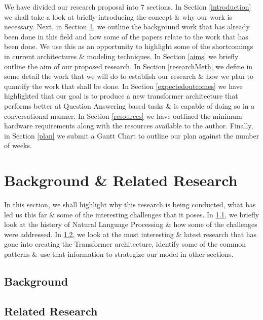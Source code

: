 \documentclass[11pt]{article}
\begin{document}
We have divided our research proposal into 7 sections.
In Section \ref{introduction} we shall take a look at briefly introducing the concept \& why our work is necessary. Next, in Section \ref{backRR}, we outline the background work that has already been done in this field and how some of the papers relate to the work that has been done. We use this as an opportunity to highlight some of the shortcomings in current architectures \& modeling techniques. In Section \ref{aims} we briefly outline the aim of our proposed research. In Section \ref{researchMeth} we define in some detail the work that we will do to establish our research \& how we plan to quantify the work that shall be done. In Section \ref{expectedoutcomes} we have highlighted that our goal is to produce a new transformer architecture that performs better at Question Answering based tasks \& is capable of doing so in a conversational manner.
In Section \ref{resources} we have outlined the minimum hardware requirements along with the resources available to the author. Finally, in Section \ref{plan} we submit a Gantt Chart to outline our plan against the number of weeks.

\section{Background \& Related Research}\label{backRR}
In this section, we shall highlight why this research is being conducted, what has led us this far \& some of the interesting challenges that it poses. In \ref{back}, we briefly look at the history of Natural Language Processing \& how some of the challenges were addressed. In \ref{rr}, we look at the most interesting \& latest research that has gone into creating the Transformer architecture, identify some of the common patterns \& use that information to strategize our model in other sections.
\subsection{Background}\label{back}

\subsection{Related Research}\label{rr}
\end{document}
